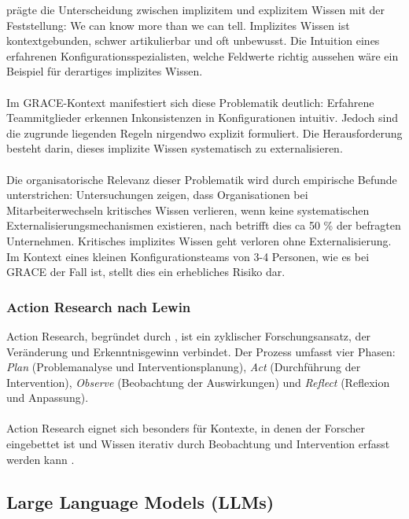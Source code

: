\cite[S.~4]{polanyi:tacit_dimension1966} prägte die Unterscheidung zwischen implizitem und explizitem Wissen mit der Feststellung: \glqq We can know more than we can tell.\grqq{} Implizites Wissen ist kontextgebunden, schwer artikulierbar und oft unbewusst. Die Intuition eines erfahrenen Konfigurationsspezialisten, welche Feldwerte \glqq richtig aussehen\grqq{} wäre ein Beispiel für derartiges implizites Wissen.\\\\ Im GRACE-Kontext manifestiert sich diese Problematik deutlich: Erfahrene Teammitglieder erkennen Inkonsistenzen in Konfigurationen intuitiv. Jedoch sind die zugrunde liegenden Regeln nirgendwo explizit formuliert. Die Herausforderung besteht darin, dieses implizite Wissen systematisch zu externalisieren.
\\\\
Die organisatorische Relevanz dieser Problematik wird durch empirische Befunde unterstrichen: Untersuchungen zeigen, dass Organisationen bei Mitarbeiterwechseln kritisches Wissen verlieren, wenn keine systematischen Externalisierungsmechanismen existieren, nach \cite{llm:tacit_knowledge2025} betrifft dies ca 50 \% der befragten Unternehmen. Kritisches implizites Wissen geht verloren ohne Externalisierung. Im Kontext eines kleinen Konfigurationsteams von 3-4 Personen, wie es bei GRACE der Fall ist, stellt dies ein erhebliches Risiko dar.

\subsubsection{Action Research nach Lewin}
\label{subsubsec:ActionResearch}

Action Research, begründet durch \cite{lewin:action_research1946}, ist ein zyklischer Forschungsansatz, der Veränderung und Erkenntnisgewinn verbindet. Der Prozess umfasst vier Phasen: \textit{Plan} (Problemanalyse und Interventionsplanung), \textit{Act} (Durchführung der Intervention), \textit{Observe} (Beobachtung der Auswirkungen) und \textit{Reflect} (Reflexion und Anpassung).\\\\
Action Research eignet sich besonders für Kontexte, in denen der Forscher eingebettet ist und Wissen iterativ durch Beobachtung und Intervention erfasst werden kann \citep{reason:handbook_action_research2001}.


\subsection{Large Language Models (LLMs)}
\label{subsec:LLMs}

